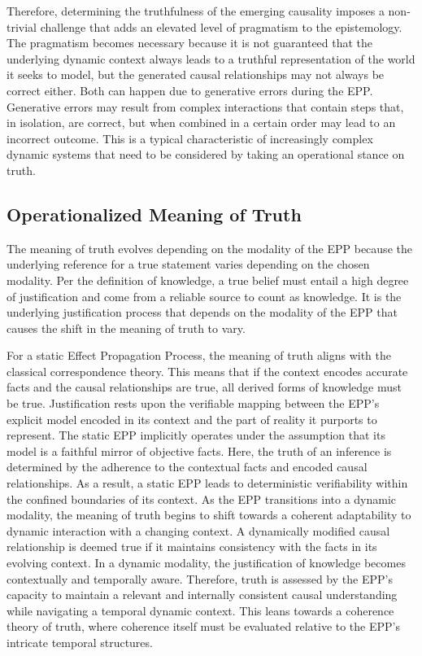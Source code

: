 Therefore, determining the truthfulness of the emerging causality imposes a non-trivial challenge that adds an elevated level of pragmatism to the epistemology. The pragmatism becomes necessary because it is not guaranteed that the underlying dynamic context always leads to a truthful representation of the world it seeks to model, but the generated causal relationships may not always be correct either. Both can happen due to generative errors during the EPP. Generative errors may result from complex interactions that contain steps that, in isolation, are correct, but when combined in a certain order may lead to an incorrect outcome. This is a typical characteristic of increasingly complex dynamic systems that need to be considered by taking an operational stance on truth.

\subsection{Operationalized Meaning of Truth}

The meaning of truth evolves depending on the modality of the EPP because the underlying reference for a true statement varies depending on the chosen modality. Per the definition of knowledge, a true belief must entail a high degree of justification and come from a reliable source to count as knowledge. It is the underlying justification process that depends on the modality of the EPP that causes the shift in the meaning of truth to vary.

For a static Effect Propagation Process, the meaning of truth aligns with the classical correspondence theory. This means that if the context encodes accurate facts and the causal relationships are true, all derived forms of knowledge must be true.
Justification rests upon the verifiable mapping between the EPP's explicit model encoded in its context and the part of reality it purports to represent. The static EPP implicitly operates under the assumption that its model is a faithful mirror of objective facts. Here, the truth of an inference is determined by the adherence to the contextual facts and encoded causal relationships. As a result, a static EPP leads to deterministic verifiability within the confined boundaries of its context.
As the EPP transitions into a dynamic modality, the meaning of truth begins to shift towards a coherent adaptability to dynamic interaction with a changing context. A dynamically modified causal relationship is deemed true if it maintains consistency with the facts in its evolving context. In a dynamic modality,  the justification of knowledge becomes contextually and temporally aware. Therefore, truth is assessed by the EPP's capacity to maintain a relevant and internally consistent causal understanding while navigating a temporal dynamic context.  This leans towards a coherence theory of truth, where coherence itself must be evaluated relative to the EPP’s intricate temporal structures.



